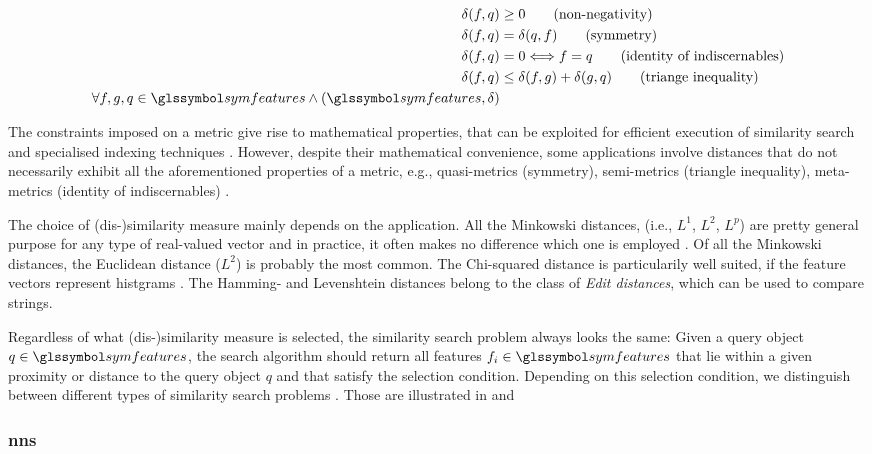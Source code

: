 \begin{align}
  \label{eq:metric}
   \delta(f,q) &\geq 0                           \tag{non-negativity} \\
   \delta(f,q) &= \delta(q,f)                    \tag{symmetry}\\
   \delta(f,q) &= 0 \Longleftrightarrow f = q    \tag{identity of indiscernables}\\
   \delta(f,q) &\leq \delta(f,g) + \delta(g,q)   \tag{triange inequality}\\
   \forall f,g,q \in \symfeatures \wedge (\symfeatures, \delta) \nonumber
\end{align}

The constraints imposed on a metric give rise to mathematical properties, that can be exploited for efficient execution of similarity search and specialised indexing techniques \cite{Zezula:2006Similarity}. However, despite their mathematical convenience, some applications involve distances that do not necessarily exhibit all the aforementioned properties of a metric, e.g., quasi-metrics (symmetry), semi-metrics (triangle inequality), meta-metrics (identity of indiscernables) \cite{Zezula:2006Similarity}.

The choice of (dis-)similarity measure mainly depends on the application. All the Minkowski distances, (i.e., $L^1$, $L^2$, $L^p$) are pretty general purpose for any type of real-valued vector and in practice, it often makes no difference which one is employed \cite{Rossetto:2018thesis}. Of all the Minkowski distances, the Euclidean distance ($L^2$) is probably the most common. The Chi-squared distance is particularily well suited, if the feature vectors represent histgrams \cite{Pele:2010Quadratic}. The Hamming- and Levenshtein distances belong to the class of \emph{Edit distances}, which can be used to compare strings.

Regardless of what (dis-)similarity measure is selected, the similarity search problem always looks the same: Given a query object $q \in \symfeatures$, the search algorithm should return all features $f_i \in \symfeatures$ that lie within a given proximity or distance to the query object $q$ and that satisfy the selection condition. Depending on this selection condition, we distinguish between different types of similarity search problems \cite{Zezula:2006Similarity}. Those are illustrated in  and 

\subsubsection{\acrfull{nns}}


